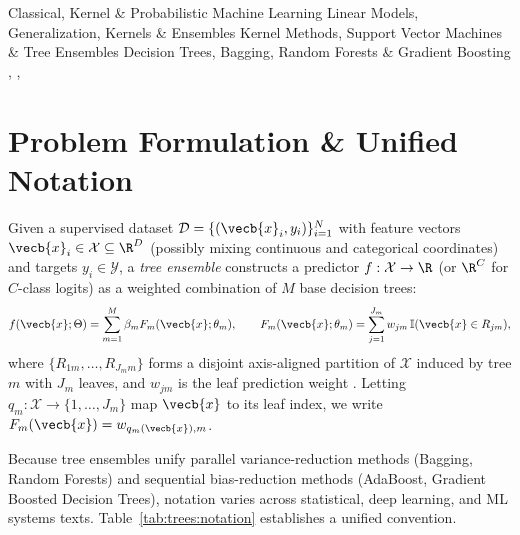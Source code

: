 \documentclass[../../../../master.tex]{subfiles}
\begin{document}
\monographleaf
  {Classical, Kernel \& Probabilistic Machine Learning}
  {Linear Models, Generalization, Kernels \& Ensembles}
  {Kernel Methods, Support Vector Machines \& Tree Ensembles}
  {Decision Trees, Bagging, Random Forests \& Gradient Boosting}
  {, , }

\section{Problem Formulation \& Unified Notation}

Given a supervised dataset $\mathcal{D} = \{(\vecb{x}_i, y_i)\}_{i=1}^{N}$ with feature vectors $\vecb{x}_i \in \mathcal{X} \subseteq \R^{D}$ (possibly mixing continuous and categorical coordinates) and targets $y_i \in \mathcal{Y}$, a \emph{tree ensemble} constructs a predictor $f : \mathcal{X} \to \R$ (or $\R^{C}$ for $C$-class logits) as a weighted combination of $M$ base decision trees:
\begin{equation}
  f(\vecb{x}; \Theta) = \sum_{m=1}^{M} \beta_m F_m(\vecb{x}; \theta_m), \qquad
  F_m(\vecb{x}; \theta_m) = \sum_{j=1}^{J_m} w_{jm}\, \mathbb{I}(\vecb{x} \in R_{jm}),
  \label{eq:trees:ensemble_def}
\end{equation}
where $\{R_{1m}, \dots, R_{J_m m}\}$ forms a disjoint axis-aligned partition of $\mathcal{X}$ induced by tree $m$ with $J_m$ leaves, and $w_{jm}$ is the leaf prediction weight . Letting $q_m : \mathcal{X} \to \{1, \dots, J_m\}$ map $\vecb{x}$ to its leaf index, we write $F_m(\vecb{x}) = w_{q_m(\vecb{x}), m}$.

Because tree ensembles unify parallel variance-reduction methods (Bagging, Random Forests) and sequential bias-reduction methods (AdaBoost, Gradient Boosted Decision Trees), notation varies across statistical, deep learning, and ML systems texts. Table~\ref{tab:trees:notation} establishes a unified convention.
\end{document}
